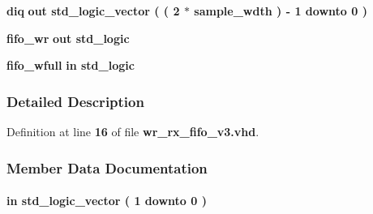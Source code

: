 \begin{DoxyCompactItemize}
\item 
{\bf diq}  {\bfseries {\bfseries \textcolor{keywordflow}{out}\textcolor{vhdlchar}{ }}} {\bfseries \textcolor{comment}{std\+\_\+logic\+\_\+vector}\textcolor{vhdlchar}{ }\textcolor{vhdlchar}{(}\textcolor{vhdlchar}{ }\textcolor{vhdlchar}{(}\textcolor{vhdlchar}{ }\textcolor{vhdlchar}{ } \textcolor{vhdldigit}{2} \textcolor{vhdlchar}{$\ast$}\textcolor{vhdlchar}{ }\textcolor{vhdlchar}{ }\textcolor{vhdlchar}{ }{\bfseries {\bf sample\+\_\+wdth}} \textcolor{vhdlchar}{ }\textcolor{vhdlchar}{)}\textcolor{vhdlchar}{ }\textcolor{vhdlchar}{-\/}\textcolor{vhdlchar}{ } \textcolor{vhdldigit}{1} \textcolor{vhdlchar}{ }\textcolor{keywordflow}{downto}\textcolor{vhdlchar}{ }\textcolor{vhdlchar}{ } \textcolor{vhdldigit}{0} \textcolor{vhdlchar}{ }\textcolor{vhdlchar}{)}\textcolor{vhdlchar}{ }} 
\item 
{\bf fifo\+\_\+wr}  {\bfseries {\bfseries \textcolor{keywordflow}{out}\textcolor{vhdlchar}{ }}} {\bfseries \textcolor{comment}{std\+\_\+logic}\textcolor{vhdlchar}{ }} 
\item 
{\bf fifo\+\_\+wfull}  {\bfseries {\bfseries \textcolor{keywordflow}{in}\textcolor{vhdlchar}{ }}} {\bfseries \textcolor{comment}{std\+\_\+logic}\textcolor{vhdlchar}{ }} 
\end{DoxyCompactItemize}


\subsubsection{Detailed Description}


Definition at line {\bf 16} of file {\bf wr\+\_\+rx\+\_\+fifo\+\_\+v3.\+vhd}.



\subsubsection{Member Data Documentation}
\paragraph[{ch\+\_\+en}]{ {\bfseries \textcolor{keywordflow}{in}\textcolor{vhdlchar}{ }} {\bfseries \textcolor{comment}{std\+\_\+logic\+\_\+vector}\textcolor{vhdlchar}{ }\textcolor{vhdlchar}{(}\textcolor{vhdlchar}{ }\textcolor{vhdlchar}{ } \textcolor{vhdldigit}{1} \textcolor{vhdlchar}{ }\textcolor{keywordflow}{downto}\textcolor{vhdlchar}{ }\textcolor{vhdlchar}{ } \textcolor{vhdldigit}{0} \textcolor{vhdlchar}{ }\textcolor{vhdlchar}{)}\textcolor{vhdlchar}{ }} \hspace{0.3cm}{\ttfamily [Port]}}\label{classwr__rx__fifo__v3_a6494f316f504075c4ccf47146756d576}


